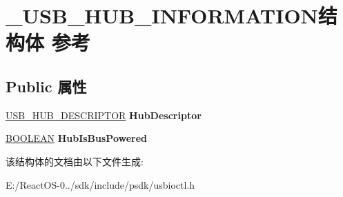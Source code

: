 \hypertarget{struct___u_s_b___h_u_b___i_n_f_o_r_m_a_t_i_o_n}{}\section{\+\_\+\+U\+S\+B\+\_\+\+H\+U\+B\+\_\+\+I\+N\+F\+O\+R\+M\+A\+T\+I\+O\+N结构体 参考}
\label{struct___u_s_b___h_u_b___i_n_f_o_r_m_a_t_i_o_n}
\subsection*{Public 属性}
\begin{DoxyCompactItemize}
\item 
\mbox{\label{struct___u_s_b___h_u_b___i_n_f_o_r_m_a_t_i_o_n_a64eaa1a98ae0e401cf31ea4613b64110}} 
\hyperlink{struct___u_s_b___h_u_b___d_e_s_c_r_i_p_t_o_r}{U\+S\+B\+\_\+\+H\+U\+B\+\_\+\+D\+E\+S\+C\+R\+I\+P\+T\+OR} {\bfseries Hub\+Descriptor}
\item 
\mbox{\label{struct___u_s_b___h_u_b___i_n_f_o_r_m_a_t_i_o_n_a4ccbafd3429ba747963b627945d7f97d}} 
\hyperlink{_processor_bind_8h_a112e3146cb38b6ee95e64d85842e380a}{B\+O\+O\+L\+E\+AN} {\bfseries Hub\+Is\+Bus\+Powered}
\end{DoxyCompactItemize}


该结构体的文档由以下文件生成\+:\begin{DoxyCompactItemize}
\item 
E\+:/\+React\+O\+S-\/0../sdk/include/psdk/usbioctl.\+h\end{DoxyCompactItemize}
